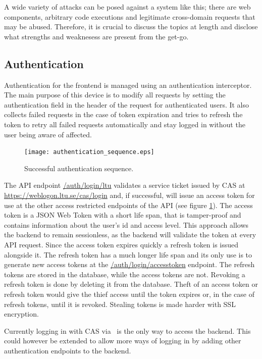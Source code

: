 A wide variety of attacks can be posed against a system like this; there are web components, arbitrary code executions and legitimate cross-domain requests that may be abused. Therefore, it is crucial to discuss the topics at length and disclose what strengths and weaknesess are present from the get-go.

\subsection{Authentication}
Authentication for the frontend is managed using an authentication interceptor. The main purpose of this device is to modify all requests by setting the authentication field in the header of the request for authenticated users. It also collects failed requests in the case of token expiration and tries to refresh the token to retry all failed requests automatically and stay logged in without the user being aware of affected.
\begin{figure}[hb]
    \centering
    \texttt{[image: authentication\_sequence.eps]}
    \caption{Successful authentication sequence.}
    \label{fig:auth}
\end{figure}

The API endpoint \url{/auth/login/ltu} validates a service ticket issued by CAS at \url{https://weblogon.ltu.se/cas/login} and, if successful, will issue an access token for use at the other access restricted endpoints of the API (see figure \ref{fig:auth}). The access token is a JSON Web Token with a short life span, that is tamper-proof and contains information about the user's id and access level. This approach allows the backend to remain sessionless, as the backend will validate the token at every API request. Since the access token expires quickly a refresh token is issued alongside it. The refresh token has a much longer life span and its only use is to generate new access tokens at the \url{/auth/login/accesstoken} endpoint. The refresh tokens are stored in the database, while the access tokens are not. Revoking a refresh token is done by deleting it from the database. Theft of an access token or refresh token would give the thief access until the token expires or, in the case of refresh tokens, until it is revoked. Stealing tokens is made harder with SSL encryption.

Currently logging in with CAS via \LTU\ is the only way to access the backend. This could however be extended to allow more ways of logging in by adding other authentication endpoints to the backend.

